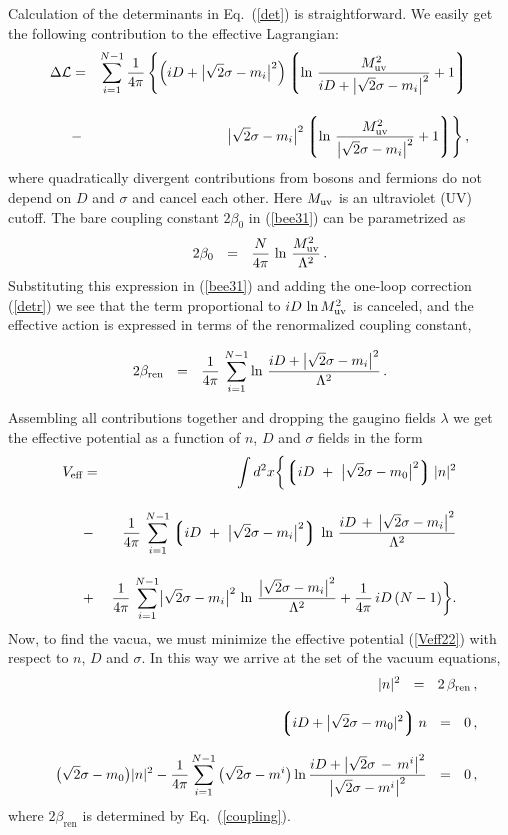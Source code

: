\documentclass[epsfig,12pt]{article}
\def\beq{\begin{equation}}
\def\eeq{\end{equation}}
\def\beqn{\begin{eqnarray}}
\def\eeqn{\end{eqnarray}}
\def\beqn{\begin{eqnarray}}
\def\eeqn{\end{eqnarray}}
\def\beq{\begin{equation}}
\def\eeq{\end{equation}}
\newcommand{\lgr}{\left\lgroup}
\newcommand{\rgr}{\right\rgroup}
\newcommand{\bren}{{\beta_\text{ren}}}
\begin{document}
Calculation of the determinants in Eq.~(\ref{det}) 
is straightforward. 
We easily get the following contribution to the
effective Lagrangian:
\beqn
\Delta{\mathcal  L} 
&=&
\sum_{i=1}^{N-1}\frac{1}{4\pi}\left\{\left(iD+\bigl|\sqrt{2}\sigma-m_i\bigr|^2\right)
\lgr \ln\, {\frac{M_{\rm uv}^2}{iD + \bigl|\sqrt{2}\sigma-m_i\bigr|^2}} + 1 \rgr
\right.
\nonumber\\[4mm]
&-&
\left. 
\bigl|\sqrt{2}\sigma-m_i\bigr|^2
\lgr \ln\, {\frac{M_{\rm uv}^2}{\bigl|\sqrt{2}\sigma-m_i\bigr|^2}} + 1\rgr
\right\},
\label{detr}
\eeqn
where quadratically divergent contributions from bosons and fermions do
not depend on
$D$ and $\sigma$ and cancel each other. Here $M_{\rm uv}$ is an ultraviolet (UV) cutoff.
 The bare coupling constant
 $2\beta_0$ in (\ref{bee31}) can be parametrized as
\beq
2\beta_0~~=~~\frac{N}{4\pi}\, \ln\, {\frac{M_{\rm uv}^2}{\Lambda^2}}\,.
\eeq
Substituting this expression in (\ref{bee31}) and adding 
the one-loop correction
(\ref{detr})
we see that the term proportional to 
$iD \,\ln {M_{\rm uv}^2}$ is canceled, and the effective action is
expressed in terms of the renormalized coupling constant,
\beq
\rule{0mm}{8mm}
	2\bren~~=~~\frac{1}{4\pi}\, 
	\sum_{i=1}^{N-1}\ln\, {\frac{iD +\bigl|\sqrt{2}\sigma-m_i\bigr|^2}{\Lambda^2}}\, .
\label{coupling}
\eeq

\vspace{2mm}

Assembling  all contributions together and dropping 
the gaugino fields $\lambda$ we get the effective potential as 
a function of $n$, $D$ and $\sigma$ fields  in
the form
\beqn
	V_\text{eff} & =& \int d^2x 
		\biggl\{  \lgr iD ~+~ \bigl|\sqrt{2}\sigma - m_0\bigr|^2 \rgr |n|^2 
	\nonumber\\[4mm]
	&-& 
	\frac{1}{4\pi}\, \sum_{i=1}^{N-1} \lgr iD ~+~ \bigl|\sqrt{2}\sigma - {m_i}\bigr|^2 \rgr\,
		\ln\, \frac{ iD \,+\, \left| \sqrt{2}\sigma - m_i \right|^2} {\Lambda^2}
\nonumber\\[4mm]
	&+& 
	\frac{1}{4\pi}\, \sum_{i=1}^{N-1} \bigl| \sqrt{2}\sigma - m_i\bigr|^2\,
			\ln\, \frac{ \bigl| \sqrt{2}\sigma -  m_i \bigr|^2 }{ \Lambda^2 }
	+
	\frac{1}{4\pi}\, iD\, (N-1)  \biggr \}  .
	\nonumber\\
	\label{Veff22}
\eeqn
Now, to find the vacua, we must minimize the 
effective potential (\ref{Veff22}) with respect to $n$, $D$ and $ \sigma $. In this way we  arrive at
the set of	the vacuum equations,
\beqn
\label{22eff1}
	&&
	|n|^2  ~~=~~ 2\,\bren\,, 
\\[3mm]				
	&&
	\lgr i D + \bigl|\sqrt{2}\sigma - m_0 |^2 \rgr n ~~=~~ 0\,, 
	\label{22eff2}
	\\[3mm]
	&&
	\bigl(\sqrt{2}\sigma - m_0 \bigr)|n|^2 
		-
	\frac{1}{4\pi} \sum_{i=1}^{N-1}\,
			\bigl(\sqrt{2}\sigma - m^i\bigr)\,
		{\rm ln}\, 
		\frac{i D + \bigl| \sqrt{2}\sigma \,-\, m^i \bigr|^2}
		{\bigl| \sqrt{2}\sigma - m^i \bigr|^2}
		 ~~=~~ 0\,,
\label{22eff3}
\nonumber\\
\eeqn
where $2\bren$ is determined by Eq.~(\ref{coupling}).
\end{document}
